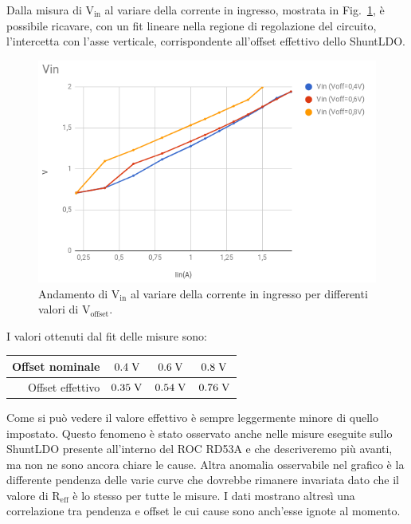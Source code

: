 Dalla misura di $\mathrm{V_{in}}$ al variare della corrente in ingresso, mostrata in Fig.~\ref{VinVsVoffset}, è possibile ricavare, con un fit lineare nella regione di regolazione del circuito, l'intercetta con l'asse verticale, corrispondente all'offset effettivo dello ShuntLDO. 
\begin{figure}
\centering
\includegraphics[scale=.4]{Immagini/VinVsVoffset}
\caption{Andamento di $\mathrm{V_{in}}$ al variare della corrente in ingresso per differenti valori di $\mathrm{V_{offset}}$.}
\label{VinVsVoffset}
\end{figure}

I valori ottenuti dal fit delle misure sono:

\begin{center}
\begin{tabular}{rccc}
\hline
Offset nominale & $0.4\rm \; V$ & $0.6\rm \; V$ & $0.8\rm \; V$\\
\hline
Offset effettivo & $0.35\rm \; V$ & $0.54\rm \; V$ & $0.76\rm \; V$\\
\hline
\end{tabular}
\end{center}
%
%
%
%

Come si può vedere il valore effettivo è sempre leggermente minore di quello impostato. Questo fenomeno è stato osservato anche nelle misure eseguite sullo ShuntLDO presente all'interno del ROC RD53A e che descriveremo più avanti, ma non ne sono ancora chiare le cause. Altra anomalia osservabile nel grafico \`e la differente pendenza delle varie curve che dovrebbe rimanere invariata dato che il valore di $\mathrm{R_{eff}}$ è lo stesso per tutte le misure. I dati mostrano altres\`i una correlazione tra pendenza e offset le cui cause sono anch'esse ignote al momento. %
\FloatBarrier

